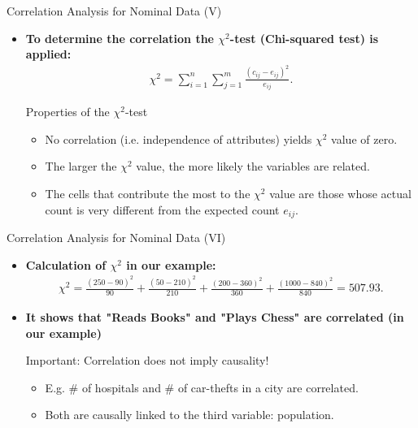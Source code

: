 \begin{frame}{Correlation Analysis for Nominal Data (V)}
	\begin{itemize}
		\item \textbf{To determine the correlation the
				      {\color{airforceblue}$\chi^2$-test} (Chi-squared test) is
			      applied:}
		      \begin{align*}
			      \chi^2 = \sum_{i=1}^{n}\sum_{j=1}^{m}
			      \frac{(c_{ij}-e_{ij})^2}{e_{ij}}.
		      \end{align*}
		      \begin{block}{Properties of the $\chi^2$-test}
			      \begin{itemize}
				      \item No correlation (i.e. independence of attributes) yields
				            $\chi^2$
				            value of zero.
				      \item The larger the $\chi^2$ value, the more likely the
				            variables are
				            related.
				      \item The cells that contribute the most to the $\chi^2$ value
				            are those whose actual count is very different from the
				            expected count
				            $e_{ij}$.
			      \end{itemize}
		      \end{block}
	\end{itemize}
\end{frame}

\begin{frame}{Correlation Analysis for Nominal Data (VI)}
	\begin{itemize}
		\item \textbf{Calculation of $\chi^2$ in our example:}
		      \begin{align*}
			      \chi^2 = \frac{(250-90)^2}{90} + \frac{(50-210)^2}{210} +
			      \frac{(200-360)^2}{360} + \frac{(1000-840)^2}{840} = 507.93.
		      \end{align*}
		\item \textbf{It shows that "Reads Books" and "Plays Chess" are
			      correlated (in our example)}
		      \vspace{5mm}
		      \begin{alertblock}{Important: Correlation does not imply causality!}
			      \begin{itemize}
				      \item E.g. $\#$ of hospitals and $\#$ of car-thefts in a city
				            are correlated.
				      \item Both are causally linked to the third variable:
				            population.
			      \end{itemize}
		      \end{alertblock}
	\end{itemize}
\end{frame}

